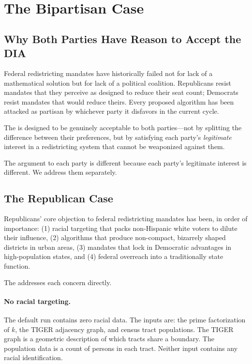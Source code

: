\section{The Bipartisan Case}
\label{sec:bipartisan}

\subsection{Why Both Parties Have Reason to Accept the DIA}

Federal redistricting mandates have historically failed not for lack of a
mathematical solution but for lack of a political coalition.
Republicans resist mandates that they perceive as designed to reduce their
seat count; Democrats resist mandates that would reduce theirs.
Every proposed algorithm has been attacked as partisan by whichever party
it disfavors in the current cycle.

The \dia{} is designed to be genuinely acceptable to both parties---not
by splitting the difference between their preferences, but by satisfying
each party's \emph{legitimate} interest in a redistricting system that
cannot be weaponized against them.

The argument to each party is different because each party's legitimate
interest is different.
We address them separately.

\subsection{The Republican Case}

Republicans' core objection to federal redistricting mandates has been, in
order of importance: (1) racial targeting that packs non-Hispanic white voters
to dilute their influence, (2) algorithms that produce non-compact,
bizarrely shaped districts in urban areas, (3) mandates that lock in
Democratic advantages in high-population states, and (4) federal
overreach into a traditionally state function.

The \dia{} addresses each concern directly.

\paragraph{No racial targeting.}
The default \ar{} run contains zero racial data.
The inputs are: the prime factorization of $k$, the TIGER adjacency graph,
and census tract populations.
The TIGER graph is a geometric description of which tracts share a boundary.
The population data is a count of persons in each tract.
Neither input contains any racial identification.

